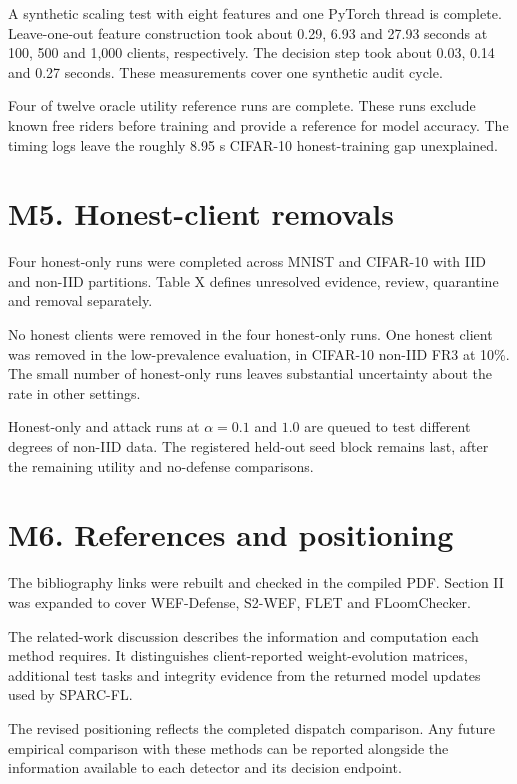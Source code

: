\documentclass[11pt,a4paper]{article}
\begin{document}
A synthetic scaling test with eight features and one PyTorch thread is
complete. Leave-one-out feature construction took about 0.29, 6.93 and
27.93 seconds at 100, 500 and 1,000 clients, respectively. The decision
step took about 0.03, 0.14 and 0.27 seconds. These measurements cover
one synthetic audit cycle.

Four of twelve oracle utility reference runs are complete. These runs
exclude known free riders before training and provide a reference for
model accuracy. The timing logs leave the roughly 8.95 s CIFAR-10
honest-training gap unexplained.

\section*{M5. Honest-client removals}

Four honest-only runs were completed across MNIST and CIFAR-10 with IID
and non-IID partitions. Table X defines unresolved evidence, review,
quarantine and removal separately.

No honest clients were removed in the four honest-only runs. One honest
client was removed in the low-prevalence evaluation, in CIFAR-10 non-IID
FR3 at 10\%. The small number of honest-only runs leaves substantial
uncertainty about the rate in other settings.

Honest-only and attack runs at $\alpha=0.1$ and $1.0$ are queued to test
different degrees of non-IID data. The registered held-out seed block
remains last, after the remaining utility and no-defense comparisons.

\section*{M6. References and positioning}

The bibliography links were rebuilt and checked in the compiled PDF.
Section II was expanded to cover WEF-Defense, S2-WEF, FLET and
FLoomChecker.

The related-work discussion describes the information and computation
each method requires. It distinguishes client-reported weight-evolution
matrices, additional test tasks and integrity evidence from the returned
model updates used by SPARC-FL.

The revised positioning reflects the completed dispatch comparison.
Any future empirical comparison with these methods can be reported
alongside the information available to each detector and its decision
endpoint.
\end{document}
